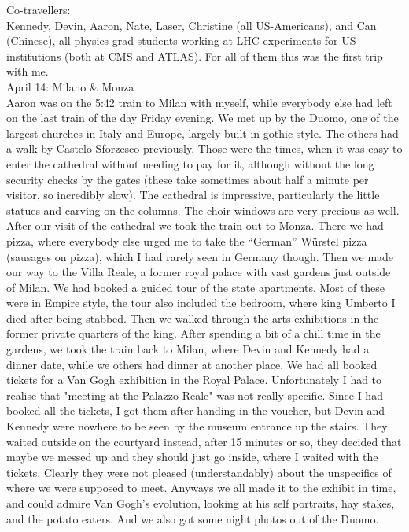 Co-travellers:\\
Kennedy, Devin, Aaron, Nate, Laser, Christine (all US-Americans), and Can (Chinese), all physics grad students working at LHC experiments for US institutions (both at CMS and ATLAS). For all of them this was the first trip with me.\\

April 14: Milano \& Monza\\
Aaron was on the 5:42 train to Milan with myself, while everybody else had left on the last train of the day Friday evening. We met up by the Duomo, one of the largest churches in Italy and Europe, largely built in gothic style. The others had a walk by Castelo Sforzesco previously. Those were the times, when it was easy to enter the cathedral without needing to pay for it, although without the long security checks by the gates (these take sometimes about half a minute per visitor, so incredibly slow). The cathedral is impressive, particularly the little statues and carving on the columns. The choir windows are very precious as well. After our visit of the cathedral we took the train out to Monza. There we had pizza, where everybody else urged me to take the ``German'' W\"urstel pizza (sausages on pizza), which I had rarely seen in Germany though. Then we made our way to the Villa Reale, a former royal palace with vast gardens just outside of Milan. We had booked a guided tour of the state apartments. Most of these were in Empire style, the tour also included the bedroom, where king Umberto I died after being stabbed. Then we walked through the arts exhibitions in the former private quarters of the king. After spending a bit of a chill time in the gardens, we took the train back to Milan, where Devin and Kennedy had a dinner date, while we others had dinner at another place. We had all booked tickets for a Van Gogh exhibition in the Royal Palace. Unfortunately I had to realise that "meeting at the Palazzo Reale" was not really specific. Since I had booked all the tickets, I got them after handing in the voucher, but Devin and Kennedy were nowhere to be seen by the museum entrance up the stairs. They waited outside on the courtyard instead, after 15 minutes or so, they decided that maybe we messed up and they should just go inside, where I waited with the tickets. Clearly they were not pleased (understandably) about the unspecifics of where we were supposed to meet. Anyways we all made it to the exhibit in time, and could admire Van Gogh's evolution, looking at his self portraits, hay stakes, and the potato eaters. And we also got some night photos out of the Duomo.\\

